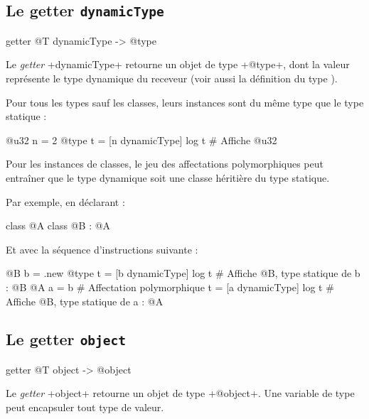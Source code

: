\subsection{Le getter \texttt{dynamicType}}

\begin{galgas4}
getter @T dynamicType -> @type
\end{galgas4}

Le \emph{getter} \ggsq+dynamicType+ retourne un objet de type \ggsq+@type+, dont la valeur représente le type dynamique du receveur (voir aussi la définition du type ).

Pour tous les types sauf les classes, leurs instances sont du même type que le type statique :

\begin{galgas4}
@u32 n = 2
@type t = [n dynamicType]
log t # Affiche @u32
\end{galgas4}

Pour les instances de classes, le jeu des affectations polymorphiques peut entraîner que le type dynamique soit une classe héritière du type statique.

Par exemple, en déclarant :
\begin{galgas4}
class @A { }
class @B : @A { }
\end{galgas4}

Et avec la séquence d'instructions suivante :
\begin{galgas4}
@B b = .new
@type t = [b dynamicType]
log t # Affiche @B, type statique de b : @B
@A a = b # Affectation polymorphique
t = [a dynamicType]
log t # Affiche @B, type statique de a : @A
\end{galgas4}





\subsection{Le getter \texttt{object}}

\begin{galgas4}
getter @T object -> @object
\end{galgas4}


Le \emph{getter} \ggsq+object+ retourne un objet de type \ggsq+@object+. Une variable de type  peut encapsuler tout type de valeur.

